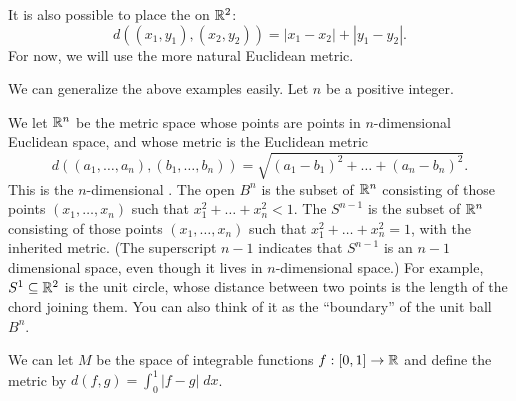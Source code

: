 \begin{example}[Taxicab on $\RR^2$]
	It is also possible to place the  on $\RR^2$:
	\[ d\left( (x_1, y_1), (x_2, y_2) \right) = 
		\left\lvert x_1-x_2 \right\rvert + \left\lvert y_1-y_2 \right\rvert.
		\]
	For now, we will use the more natural Euclidean metric.
\end{example}

\begin{example}
	We can generalize the above examples easily.
	Let $n$ be a positive integer.
	\begin{enumerate}[(a)]
		\ii We let $\mathbb R^n$ be the metric space whose points are points in $n$-dimensional Euclidean space,
		and whose metric is the Euclidean metric
		\[
			d\left( 
			\left( a_1, \dots, a_n \right), \left( b_1, \dots, b_n \right)
			\right)
			= \sqrt{(a_1-b_1)^2 + \dots + (a_n-b_n)^2}.
		\]
		This is the $n$-dimensional .
		\ii The open  $B^{n}$ is the subset of $\mathbb R^n$
		consisting of those points $\left( x_1, \dots, x_n \right)$
		such that $x_1^2 + \dots + x_n^2 < 1$.
		\ii The  $S^{n-1}$ is the subset of $\mathbb R^n$
		consisting of those points $\left( x_1, \dots, x_n \right)$
		such that $x_1^2 + \dots + x_n^2 = 1$, with the inherited metric.
		(The superscript $n-1$ indicates that $S^{n-1}$ is an $n-1$ dimensional space,
		even though it lives in $n$-dimensional space.)
		For example, $S^1 \subseteq \mathbb R^2$ is the unit circle,
		whose distance between two points is the length of the chord joining them.
		You can also think of it as the ``boundary'' of the unit ball $B^n$.
	\end{enumerate}
\end{example}
\begin{example}
	We can let $M$ be the space of
	integrable functions $f : [0,1] \to \mathbb R$ and define the metric
	by $d(f,g) = \int_0^1 \left\lvert f-g \right\rvert \; dx$.
\end{example}


